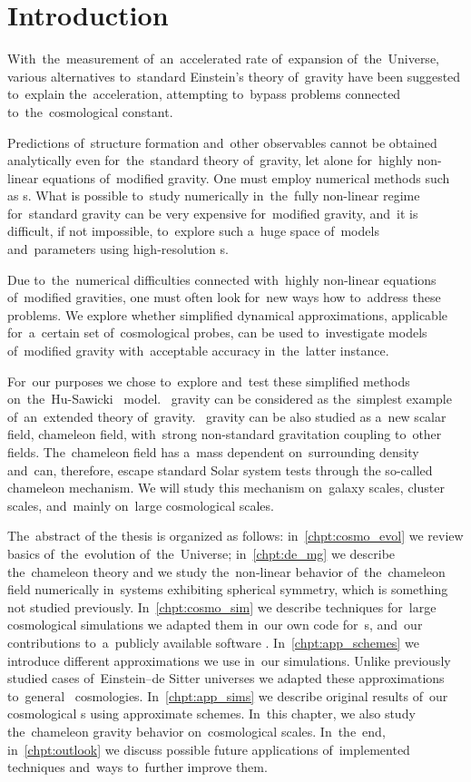 \chapter{Introduction}
With~the~measurement of~an~accelerated rate of~expansion of~the~Universe, various alternatives to~standard Einstein's theory of~gravity have been suggested to~explain the~acceleration, attempting to~bypass problems connected to~the~cosmological constant.

Predictions of~structure formation and~other observables cannot be obtained analytically even for~the~standard theory of~gravity, let alone for~highly non-linear equations of~modified gravity. One must employ numerical methods such as \nbodysim s. What is possible to~study numerically in~the~fully non-linear regime for~standard gravity can be very expensive for~modified gravity, and~it is difficult, if not impossible, to~explore such a~huge space of~models and~parameters using high-resolution \nbodysim s.

Due to~the~numerical difficulties connected with~highly non-linear equations of~modified gravities, one must often look for~new ways how to~address these problems. We explore whether simplified dynamical approximations, applicable for~a~certain set of~cosmological probes, can be used to~investigate models of~modified gravity with~acceptable accuracy in~the~latter instance.

For~our purposes we chose to~explore and~test these simplified methods on~the~Hu-Sawicki \fR\ model. \fR\ gravity can be considered as the~simplest example of~an~extended theory of~gravity. \fR\ gravity can be also studied as a~new scalar field, chameleon field, with~strong non-standard gravitation coupling to~other fields. The~chameleon field has a~mass dependent on~surrounding density and~can, therefore, escape standard Solar system tests through the so-called chameleon mechanism. We will study this mechanism on~galaxy scales, cluster scales, and~mainly on~large cosmological scales.

The~abstract of the thesis is organized as follows: in~\autoref{chpt:cosmo_evol} we review basics of~the~evolution of~the~Universe; in~\autoref{chpt:de_mg} we describe the~chameleon theory and we study the~non-linear behavior of~the~chameleon field numerically in~systems exhibiting spherical symmetry, which is something not studied previously. In~\autoref{chpt:cosmo_sim} we describe techniques for~large cosmological simulations we adapted them in~our own code for~\nbodysim s, and~our contributions to~a~publicly available software . In~\autoref{chpt:app_schemes} we introduce different approximations we use in~our simulations. Unlike previously studied cases of~Einstein--de Sitter universes we adapted these approximations to~general \LCDM\ cosmologies. In~\autoref{chpt:app_sims} we describe original results of~our cosmological \nbodysim s using approximate schemes. In~this chapter, we also study the~chameleon gravity behavior on~cosmological scales. %
In~the~end, in~\autoref{chpt:outlook} we discuss possible future applications of~implemented techniques and~ways to~further improve them.
